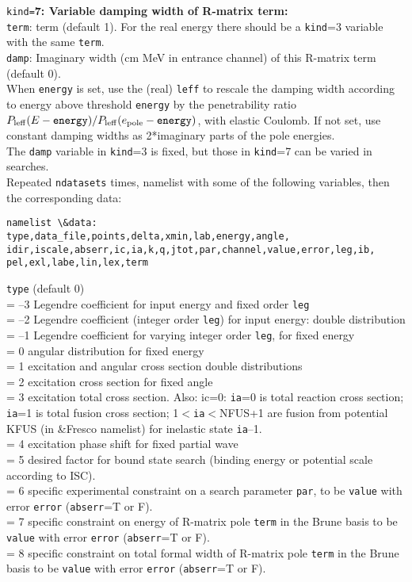\documentclass[11pt]{article}
\begin{document}
{\tt kind=}{\bf 7: Variable damping width of R-matrix term:}\\
{\tt term}: term (default 1). For the real energy there should be a {\tt kind}=3 variable with the same {\tt term}.\\
{\tt damp}:  Imaginary width (cm MeV in entrance channel) of this R-matrix term (default 0). \\%
When {\tt energy} is  set, use the (real)  {\tt leff} to rescale the damping width according to energy above threshold {\tt energy} 
    by the penetrability ratio $P_{\rm leff}(E - {\tt energy})/P_{\rm leff}(e_{\rm pole} - {\tt energy})$, with elastic Coulomb. 
    If not set, use constant damping widths as  2*imaginary parts of the pole energies. \\
The {\tt damp} variable in {\tt kind}=3 is fixed, but those in {\tt kind}=7 can be varied in searches.\\



Repeated {\tt ndatasets} times, namelist with some of the following variables, then the
corresponding data:
\begin{verbatim}
namelist \&data:
type,data_file,points,delta,xmin,lab,energy,angle,
idir,iscale,abserr,ic,ia,k,q,jtot,par,channel,value,error,leg,ib,
pel,exl,labe,lin,lex,term
\end{verbatim}

{\tt type} (default 0)
\\ = --3 Legendre coefficient for input energy and fixed order {\tt leg}
\\ = --2 Legendre coefficient (integer order {\tt leg}) for input energy: double distribution
\\ = --1 Legendre coefficient for varying integer order {\tt leg}, for fixed energy
\\ = 0 angular distribution for fixed energy
\\ = 1 excitation and angular cross section double distributions
\\ = 2 excitation cross section for fixed angle
\\ = 3 excitation total cross section. Also: ic=0: {\tt ia}=0 is total reaction cross section;
{\tt ia}=1 is total fusion cross section; 1$<${\tt ia}$<$NFUS+1 are fusion from potential
KFUS (in \&Fresco namelist) for inelastic state {\tt ia}--1.
\\ = 4 excitation phase shift for fixed partial wave
\\ = 5 desired factor for bound state search (binding energy or potential scale
 according to ISC).
\\ = 6 specific experimental constraint on a search parameter {\tt par},
    to be {\tt value} with error {\tt error} ({\tt abserr}=T or F).
\\ = 7 specific constraint on energy of R-matrix pole {\tt term} in the Brune basis 
    to be {\tt value} with error {\tt error} ({\tt abserr}=T or F).
\\ = 8 specific constraint on total formal width of R-matrix pole {\tt term} in the Brune basis 
    to be {\tt value} with error {\tt error} ({\tt abserr}=T or F).
\end{document}
